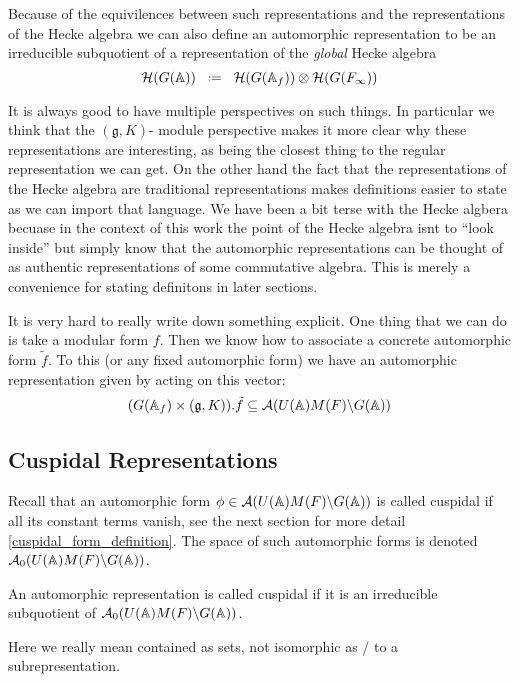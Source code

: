 Because of the equivilences between such representations and the representations of the Hecke algebra we can also define an automorphic representation to be an irreducible subquotient of a representation of the \textit{global} Hecke algebra
\[\mathcal{H}(G(\A)) \defeq \mathcal{H}(G(\A_f)) \tensor \mathcal{H}(G(F_\infty))\]

It is always good to have multiple perspectives on such things. In particular we think that the \((\mathfrak{g}, K)\)- module perspective makes it more clear why these representations are interesting, as being the closest thing to the regular representation we can get. On the other hand the fact that the representations of the Hecke algebra are traditional representations makes definitions easier to state as we can import that language. We have been a bit terse with the Hecke algbera becuase in the context of this work the point of the Hecke algebra isnt to ``look inside'' but simply know that the automorphic representations can be thought of as authentic representations of some commutative algebra. This is merely a convenience for stating definitons in later sections.

\begin{example}
    It is very hard to really write down something explicit. One thing that we can do is take a modular form \(f\). Then we know how to associate a concrete automorphic form \(\tilde{f}\). To this (or any fixed automorphic form) we have an automorphic representation given by acting on this vector:
    \[(G(\A_f)\times (\mathfrak{g}, K)).\tilde{f} \subseteq \mathcal{A}(U(\A)M(F)\backslash G(\A))\]
\end{example}

\subsection{Cuspidal Representations}
Recall that an automorphic form \(\phi\in \mathcal{A}(U(\A)M(F) \backslash G(\A))\) is called cuspidal  if all its constant terms vanish, see the next section for more detail \ref{cuspidal_form_definition}.
The space of such automorphic forms is denoted \(\mathcal{A}_0(U(\A)M(F) \backslash G(\A))\). 

An automorphic representation is called cuspidal if it is an irreducible subquotient of \(\mathcal{A}_0(U(\A)M(F) \backslash G(\A))\).

\begin{Remark}
    Here we really mean contained as sets, not isomorphic as / to a subrepresentation.
\end{Remark}

